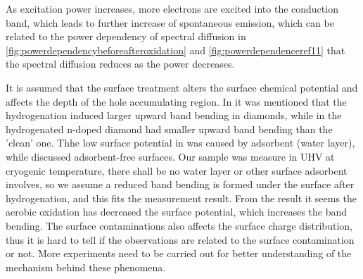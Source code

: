 As excitation power increases, more electrons are excited into the conduction band, which leads to further increase of spontaneous emission, which can be related to the power dependency of spectral diffusion in \ref{fig:powerdependencybeforeafteroxidation} and  \ref{fig:powerdependenceref11} that the spectral diffusion reduces as the power decreases.

It is assumed that the surface treatment alters the surface chemical potential and affects the depth of  the hole accumulating region. In \citep{stacey_depletion_2012} it was mentioned that the hydrogenation induced larger upward band bending in diamonds, while in \citep{diederich_electron_1998} the hydrogenated n-doped diamond had smaller upward band bending than the 'clean' one. Thhe low surface potential in \citep{stacey_depletion_2012} was caused by adsorbent (water layer), while \citep{diederich_electron_1998} discussed adsorbent-free surfaces. Our sample was measure in UHV at cryogenic temperature, there shall be no water layer or other surface adsorbent involves, so we assume a reduced band bending is formed under the surface after hydrogenation, and this fits the measurement result. From the result it seems the aerobic oxidation has decreased the surface potential, which increases the band bending. The surface contaminations also affects the surface charge distribution, thus it is hard to tell if the observations are related to the surface contamination or not. More experiments need to be carried out for better understanding of the mechanism behind these phenomena. 




